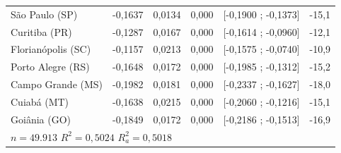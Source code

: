 \documentclass[12pt,a4paper,header]{abnt}
\begin{document}
\begin{center}
\begin{longtable}{lccccc}
São Paulo (SP) & -0,1637 & 0,0134 & 0,000 & [-0,1900 ; -0,1373] & -15,1 \\
Curitiba (PR) & -0,1287 & 0,0167 & 0,000 & [-0,1614 ; -0,0960] & -12,1 \\
Florianópolis (SC) & -0,1157 & 0,0213 & 0,000 & [-0,1575 ; -0,0740] & -10,9 \\
Porto Alegre (RS) & -0,1648 & 0,0172 & 0,000 & [-0,1985 ; -0,1312] & -15,2 \\
Campo Grande (MS) & -0,1982 & 0,0181 & 0,000 & [-0,2337 ; -0,1627] & -18,0 \\
Cuiabá (MT) & -0,1638 & 0,0215 & 0,000 & [-0,2060 ; -0,1216] & -15,1 \\
Goiânia (GO) & -0,1849 & 0,0172 & 0,000 & [-0,2186 ; -0,1513] & -16,9 \\
\midrule
\multicolumn{6}{l}{$n = 49.913$ \hspace{2cm} $R^2 = 0,5024$ \hspace{2cm} $R^2_a = 0,5018$} \\
\end{longtable}
\end{center}
\end{document}
